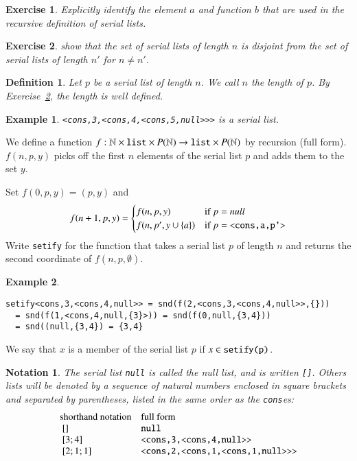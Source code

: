 \documentclass[cup9a]{cupbook}
\newtheorem{definition}{Definition}[chapter]
\newtheorem{example}{Example}[chapter]
\newtheorem{exer}{Exercise}[chapter]
\newtheorem{notation}{Notation}[chapter]
\begin{document}
\begin{exer} Explicitly identify the element $a$ and function $b$ that are used in the recursive definition of serial lists.
\end{exer}

\begin{exer}\label{exer:list-length} show that the set of serial lists of length $n$ is disjoint from the set of serial lists of length $n'$ for $n\ne n'$.
\end{exer}

\begin{definition} Let $p$ be a serial list of length $n$.  We call $n$ the length of $p$.  By Exercise~\ref{exer:list-length}, the length is well defined.
\end{definition}


\begin{example}
\verb!<cons,3,<cons,4,<cons,5,null>>>!
is a serial list.
\end{example}

We define a function $f:\ring{N}\times \verb!list!\times P(\ring{N})\to \verb!list!\times P(\ring{N})$ by recursion (full form).  $f(n,p,y)$ picks off the first $n$ elements of the serial list $p$ and adds them to the set $y$.

Set $f(0,p,y) = (p,y)$ and
$$
f(n+1,p,y) = \begin{cases} f(n,p,y) & \hbox{if } p = null\\
                f(n,p',y\cup\{a\}) & \hbox{if } p = \verb!<cons,a,p'>!\\
\end{cases}
$$
Write \verb!setify! for the function that takes a serial list $p$
of length $n$ and returns the second coordinate of $f(n,p,\emptyset)$.

\begin{example}
\begin{verbatim}
setify<cons,3,<cons,4,null>> = snd(f(2,<cons,3,<cons,4,null>>,{})) 
  = snd(f(1,<cons,4,null,{3}>)) = snd(f(0,null,{3,4})) 
  = snd((null,{3,4}) = {3,4}
\end{verbatim}
\end{example}

We say that $x$ is a member of the serial list $p$ if $x\in\verb!setify(p)!$.


\begin{notation} The serial list \verb!null! is called the null list, and is written \verb![]!.  Others lists will be denoted by a sequence of natural numbers enclosed in square brackets and separated by parentheses, listed in the same order as the \verb!cons!es:
$$
\begin{array}{lll}
\hbox{shorthand notation} & \hbox{full form}\\
~[]&\verb!null!\\
~[3;4]&\verb!<cons,3,<cons,4,null>>!\\
~[2;1;1]&\verb!<cons,2,<cons,1,<cons,1,null>>>!\\
\end{array}
$$
\end{notation}
\end{document}
